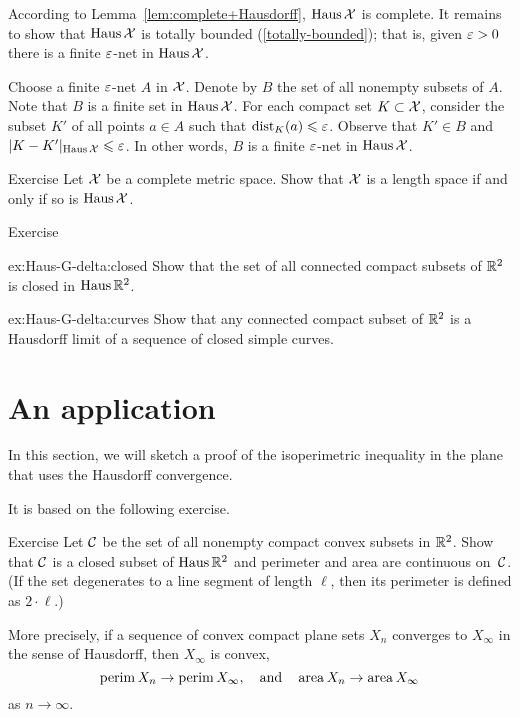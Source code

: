 According to Lemma~\ref{lem:complete+Hausdorff},
$\operatorname{\rm Haus}\nolimits\mathcal{X}$ is complete.
It remains to show that $\operatorname{\rm Haus}\nolimits\mathcal{X}$ is totally bounded (\ref{totally-bounded});
that is, given $\varepsilon>0$ there is a finite $\varepsilon$-net in $\operatorname{\rm Haus}\nolimits\mathcal{X}$.

Choose a finite $\varepsilon$-net $A$ in $\mathcal{X}$.
Denote by $B$ the set of all nonempty subsets of $A$.
Note that  $B$ is a finite set in $\operatorname{\rm Haus}\nolimits\mathcal{X}$.
For each compact set $K\subset \mathcal{X}$, consider the subset $K'$ of all points $a\in A$
such that $\mathrm{dist}_K(a)\leqslant \varepsilon$.
Observe that $K' \in B$ and $|K-K'|_{\operatorname{\rm Haus}\nolimits\mathcal{X}}\leqslant\varepsilon$.
In other words, $B$ is a finite $\varepsilon$-net in $\operatorname{\rm Haus}\nolimits\mathcal{X}$.
\qeds

\begin{thm}{Exercise}\label{ex:Haus-length}
Let $\mathcal{X}$ be a complete metric space.
Show that $\mathcal{X}$ is a length space if and only if so is $\operatorname{\rm Haus}\nolimits\mathcal{X}$.
\end{thm}

\begin{thm}{Exercise}\label{ex:Haus-G-delta}

\begin{subthm}{ex:Haus-G-delta:closed}
Show that the set of all connected compact subsets of $\mathbb{R}^2$ is closed in $\operatorname{\rm Haus}\nolimits\mathbb{R}^2$. 
\end{subthm}

\begin{subthm}{ex:Haus-G-delta:curves}
Show that any connected compact subset of $\mathbb{R}^2$ is a Hausdorff limit of a sequence of closed simple curves.
\end{subthm}




\end{thm}


\section{An application}


In this section, we will sketch a proof of the isoperimetric inequality in the plane that uses the Hausdorff convergence.

It is based on the following exercise.

\begin{thm}{Exercise}\label{ex:Huas-perimeter-area}
Let $\mathcal{C}$ be the set of all nonempty compact convex subsets in $\mathbb{R}^2$.
Show that $\mathcal{C}$ is a closed subset of $\operatorname{\rm Haus}\nolimits\mathbb{R}^2$ and 
perimeter and area are continuous on~$\mathcal{C}$.
(If the set degenerates to a line segment of length $\ell$, then its perimeter is defined as $2\cdot \ell$.)

More precisely, if a sequence of convex compact plane sets $X_n$ converges to $X_\infty$ in the sense of Hausdorff, then $X_\infty$ is convex,
\[\operatorname{\rm perim}\nolimits X_n\to \operatorname{\rm perim}\nolimits X_\infty,\quad\text{and}\quad\operatorname{\rm area}\nolimits X_n\to\operatorname{\rm area}\nolimits X_\infty\]
as $n\to\infty$.
\end{thm}


